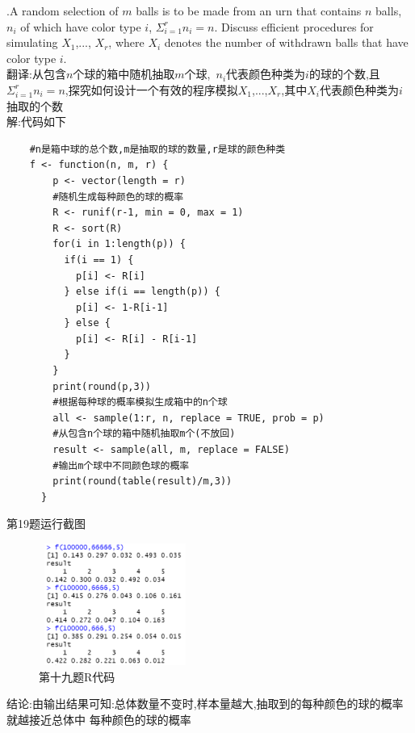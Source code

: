 \documentclass{book}
\begin{document}
.A random selection of $m$ balls is to be made from an urn that contains $n$ balls,
$n_{i}$ of which have color type $i$, $\Sigma_{i=1}^{r} n_{i} = n$. Discuss efficient
procedures for simulating $X_{1}$,..., $X_{r}$, where $X_{i}$ denotes the number of
withdrawn balls that have color type $i$. \\
翻译:从包含$n$个球的箱中随机抽取$m$个球,\ $n_{i}$代表颜色种类为$i$的球的个数,且$\Sigma_{i=1}^{r}
  n_{i} = n$,探究如何设计一个有效的程序模拟$X_{1}$,...,$X_{r}$,其中$X_{i}$代表颜色种类为$i$
抽取的个数 \\
解:代码如下
\lstset{language = R}
\begin{lstlisting}
    #n是箱中球的总个数,m是抽取的球的数量,r是球的颜色种类
    f <- function(n, m, r) {
        p <- vector(length = r)
        #随机生成每种颜色的球的概率
        R <- runif(r-1, min = 0, max = 1)
        R <- sort(R)
        for(i in 1:length(p)) {
          if(i == 1) {
            p[i] <- R[i]
          } else if(i == length(p)) {
            p[i] <- 1-R[i-1]
          } else {
            p[i] <- R[i] - R[i-1]
          }
        }
        print(round(p,3))
        #根据每种球的概率模拟生成箱中的n个球
        all <- sample(1:r, n, replace = TRUE, prob = p)
        #从包含n个球的箱中随机抽取m个(不放回)
        result <- sample(all, m, replace = FALSE)
        #输出m个球中不同颜色球的概率
        print(round(table(result)/m,3))
      }
\end{lstlisting}
第19题运行截图
\begin{figure}[H]
  \centering
  \includegraphics*[height = 4cm, width = 5cm]{gramFile/第十九题运行截图.PNG}
  \caption{第十九题R代码}
\end{figure}
\noindent
结论:由输出结果可知:总体数量不变时,样本量越大,抽取到的每种颜色的球的概率就越接近总体中
每种颜色的球的概率 \\
\end{document}
